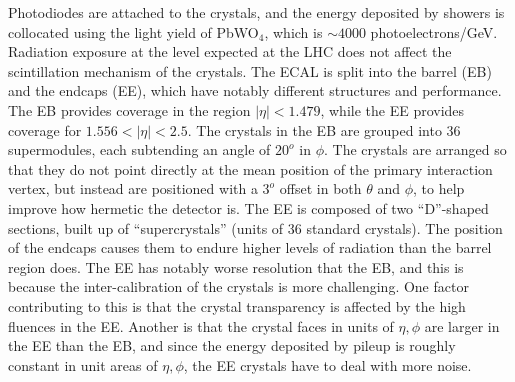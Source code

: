 \documentclass[10pt]{article}
\begin{document}
Photodiodes are attached to the crystals, and the energy deposited by showers is collocated using the light yield of PbWO$_4$, which is  $\sim 4000 $ photoelectrons/GeV. Radiation exposure at the level expected at the LHC does not affect the scintillation mechanism of the crystals.
The ECAL is split into the barrel (EB) and the endcaps (EE), which have notably different structures and performance. The EB provides coverage in the region $|\eta| < 1.479$, while the EE provides coverage for $1.556 < |\eta| < 2.5$. The crystals in the EB are grouped into 36 supermodules, each subtending an angle of $20^o$ in $\phi$. The crystals are arranged so that they do not point directly at the mean position of the primary interaction vertex, but instead are positioned with a $3^o$ offset in both $\theta$ and $\phi$, to help improve how hermetic the detector is. The EE is composed of two ``D''-shaped sections, built up of ``supercrystals'' (units of 36 standard crystals). The position of the endcaps causes them to endure higher levels of radiation than the barrel region does. The EE has notably worse resolution that the EB, and this is because the inter-calibration of the crystals is more challenging. One factor contributing to this is that the crystal transparency is affected by the high fluences in the EE. Another is that the crystal faces in units of $\eta,\phi$ are larger in the EE than the EB, and since the energy deposited by pileup is roughly constant in unit areas of $\eta,\phi$, the EE crystals have to deal with more noise.
\end{document}
